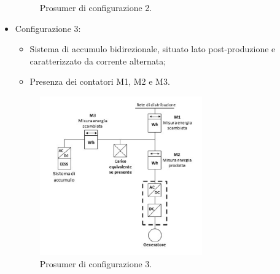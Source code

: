 \begin{itemize}
\begin{figure}[H]
              \caption{Prosumer di configurazione 2.}
              \label{fig:Prosumer_configurazione_2}
          \end{figure}
    \item Configurazione 3:
          \begin{itemize}
              \item Sistema di accumulo bidirezionale, situato lato post-produzione e caratterizzato da corrente alternata;
              \item Presenza dei contatori M1, M2 e M3.
          \end{itemize}
          \begin{figure}[H]
              \centering
              \includegraphics[width=7cm]{images/config03.png}
              \caption{Prosumer di configurazione 3.}
              \label{fig:Prosumer_configurazione_}
          \end{figure}
\end{itemize}

